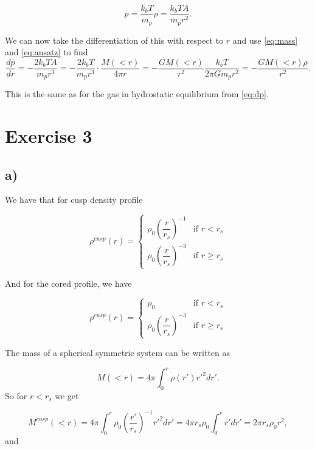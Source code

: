 \documentclass[a4paper,norsk, 10pt]{article}
\begin{document}
\begin{equation}
p = \dfrac{k_b T}{m_p}\rho = \dfrac{k_b T A}{m_p r^2}.
\end{equation}

We can now take the differentiation of this with respect to $r$ and use \eqref{eq:mass} and \eqref{eq:ansatz} to find
\begin{equation}
\frac{dp}{dr} = -\dfrac{2 k_b T A}{m_p r^3} =  -\dfrac{2 k_b T}{m_p r^3} \cdot \dfrac{M(<r)}{4\pi r} = - \frac{GM(<r)}{r^2}\dfrac{k_b T}{2\pi G m_p r^2} =  - \dfrac{GM(<r)\rho}{r^2}.
\end{equation}

This is the same as for the gas in hydrostatic equilibrium from \eqref{eq:dp}.

\section{Exercise 3}
\subsection{a)}
We have that for cusp density profile

\begin{equation}
\rho^{cusp}(r) =
\left\{
	\begin{array}{ll}
		\rho_0\left(\dfrac{r}{r_s}\right)^{-1}  & \mbox{if } r < r_s \\
		\rho_0\left(\dfrac{r}{r_s}\right)^{-3} & \mbox{if } r \geq r_s
	\end{array}
\right.
\end{equation}

And for the cored profile, we have

\begin{equation}
\rho^{cusp}(r) =
\left\{
	\begin{array}{ll}
		\rho_0  & \mbox{if } r < r_s \\
		\rho_0\left(\dfrac{r}{r_s}\right)^{-3} & \mbox{if } r \geq r_s
	\end{array}
\right.
\end{equation}

The mass of a spherical symmetric system can be written as 

\begin{equation}
M(<r) = 4\pi \int_0^r \rho(r') r'^2 dr'.
\end{equation}
So for $r<r_s$ we get

\begin{equation}
M^{cusp}(<r) = 4\pi \int_0^r \rho_0\left(\dfrac{r'}{r_s}\right)^{-1} r'^2 dr' = 4\pi r_s \rho_0 \int_0^r r' dr'  = 2\pi r_s \rho_0 r^2,
\end{equation}
and
\end{document}
